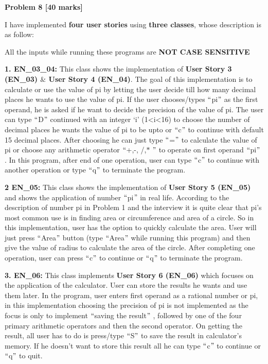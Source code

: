\documentclass[12pt]{article}
\begin{document}
\vspace{\baselineskip}
{\fontsize{13pt}{15.6pt}\selectfont \textbf{Problem 8 [40 marks]}\par}\par

I have implemented \textbf{four user stories} using \textbf{three classes}, whose description is as follow:\par

All the inputs while running these programs are \textbf{NOT CASE SENSITIVE }\par

\textbf{1. EN\_03\_04: }This class shows the implementation of \textbf{User Story 3 (EN\_03) $\&$  User Story 4 (EN\_04)}. The goal of this implementation is to calculate or use the value of pi by letting the user decide till how many decimal places he wants to use the value of pi. If the user chooses/types $``$pi$"$  as the first operand, he is asked if he want to decide the precision of the value of pi. The user can type $``$D$"$  continued with an integer ‘i’ (1<i<16) to choose the number of decimal places he wants the value of pi to be upto or $``$c$"$  to continue with default 15 decimal places. After choosing he can just type $``$=$"$  to calculate the value of pi or choose any arithmetic operator $``$+,-, /,$\ast$ $"$  to operate on first operand $``$pi$"$ . In this program, after end of one operation, user can type $``$c$"$  to continue with another operation or type $``$q$"$  to terminate the program.\par

\textbf{2 EN\_05: }This class shows the implementation of \textbf{User Story 5 (EN\_05)} and shows the application of number $``$pi$"$ in real life. According to the description of number pi in Problem 1 and the interview it is quite clear that pi’s most common use is in finding area or circumference and area of a circle. So in this implementation, user has the option to quickly calculate the area. User will just press $``$Area$"$  button (type $``$Area$"$  while running this program) and then give the value of radius to calculate the area of the circle. After completing one operation, user can press $``$c$"$  to continue or $``$q$"$  to terminate the program.\par

\textbf{3. EN\_06: }This class implements \textbf{User Story 6 (EN\_06) }which focuses on the application of the calculator. User can store the results he wants and use them later. In the program, user enters first operand as a rational number or pi, in this implementation choosing the precision of pi is not implemented as the focus is only to implement $``$saving the result$"$ , followed by one of the four primary arithmetic operators and then the second operator. On getting the result, all user has to do is press/type $``$S$"$  to save the result in calculator’s memory. If he doesn’t want to store this result all he can type $``$c$"$  to continue or $``$q$"$  to quit.\par
\end{document}
